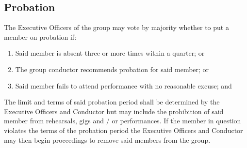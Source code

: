 \documentclass{article}
\begin{document}
\subsection{Probation}

The Executive Officers of the group may vote by majority whether to
put a member on probation if:
\begin{enumerate}
\item Said member is absent three or more times within a quarter; or
\item The group conductor recommends probation for said member; or
\item Said member fails to attend performance with no reasonable excuse;
and
\end{enumerate}
The limit and terms of said probation period shall be determined by
the Executive Officers and Conductor but may include the prohibition
of said member from rehearsals, gigs and / or performances. If the
member in question violates the terms of the probation period the
Executive Officers and Conductor may then begin proceedings to remove
said members from the group.

\end{document}
